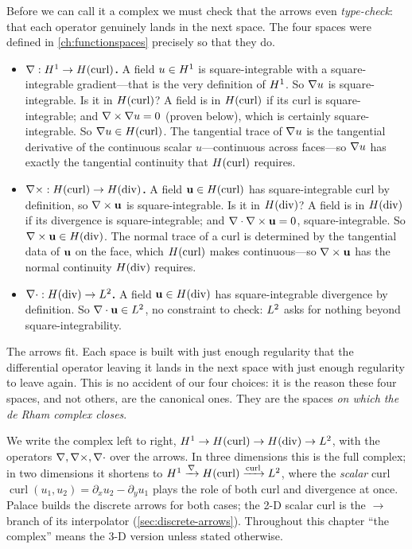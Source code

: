 Before we can call it a complex we must check that the arrows even \emph{type-check}:
that each operator genuinely lands in the next space. The four spaces were defined
in \cref{ch:functionspaces} precisely so that they do.

\begin{itemize}[nosep]
\item \textbf{$\nabla : H^1 \to H(\mathrm{curl})$.} A field $u\in H^1$ is square-integrable
  with a square-integrable gradient---that is the very definition of $H^1$. So
  $\nabla u$ is square-integrable. Is it in $H(\mathrm{curl})$? A field is in $H(\mathrm{curl})$ if its
  curl is square-integrable; and $\nabla\times\nabla u = 0$ (proven below), which is
  certainly square-integrable. So $\nabla u\in H(\mathrm{curl})$. The tangential trace of
  $\nabla u$ is the tangential derivative of the continuous scalar $u$---continuous
  across faces---so $\nabla u$ has exactly the tangential continuity that $H(\mathrm{curl})$
  requires.
\item \textbf{$\nabla\times : H(\mathrm{curl}) \to H(\mathrm{div})$.} A field $\mathbf{u}\in H(\mathrm{curl})$ has
  square-integrable curl by definition, so $\nabla\times\mathbf{u}$ is square-integrable. Is it in
  $H(\mathrm{div})$? A field is in $H(\mathrm{div})$ if its divergence is square-integrable; and
  $\nabla\cdot\nabla\times\mathbf{u}=0$, square-integrable. So $\nabla\times\mathbf{u}\in H(\mathrm{div})$. The normal trace of a
  curl is determined by the tangential data of $\mathbf{u}$ on the face, which $H(\mathrm{curl})$
  makes continuous---so $\nabla\times\mathbf{u}$ has the normal continuity $H(\mathrm{div})$ requires.
\item \textbf{$\nabla\cdot : H(\mathrm{div}) \to L^2$.} A field $\mathbf{u}\in H(\mathrm{div})$ has square-integrable
  divergence by definition. So $\nabla\cdot\mathbf{u}\in L^2$, no constraint to check: $L^2$
  asks for nothing beyond square-integrability.
\end{itemize}

The arrows fit. Each space is built with just enough regularity that the
differential operator leaving it lands in the next space with just enough regularity
to leave again. This is no accident of our four choices: it is the reason these four
spaces, and not others, are the canonical ones. They are the spaces \emph{on which
the de Rham complex closes}.

\begin{notationbox}
We write the complex left to right, $H^1\to H(\mathrm{curl})\to H(\mathrm{div})\to L^2$, with the
operators $\nabla,\nabla\times,\nabla\cdot$ over the arrows. In three dimensions this is the full
complex; in two dimensions it shortens to
$H^1\xrightarrow{\nabla}H(\mathrm{curl})\xrightarrow{\operatorname{curl}}L^2$, where the
\emph{scalar} curl $\operatorname{curl}(u_1,u_2)=\partial_x u_2-\partial_y u_1$ plays
the role of both curl and divergence at once. Palace builds the discrete arrows for
both cases; the 2-D scalar curl is the $\to$ branch of
its interpolator (\cref{sec:discrete-arrows}). Throughout this chapter ``the
complex'' means the 3-D version unless stated otherwise.
\end{notationbox}

